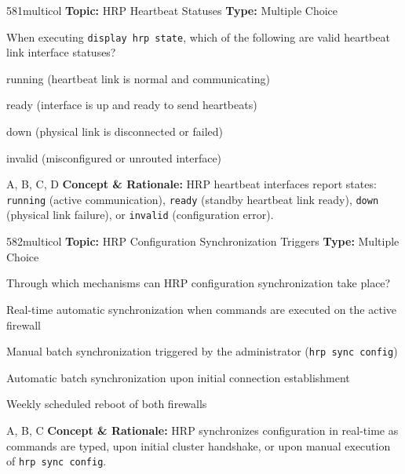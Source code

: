 \begin{qcard}{581}{multicol}
\textcolor{darkslate!75}{\small\textbf{Topic:} HRP Heartbeat Statuses \hfill \textbf{Type:} Multiple Choice}\vspace{0.4em}\par
When executing \texttt{display hrp state}, which of the following are valid heartbeat link interface statuses?
\begin{qoptions}
\item running (heartbeat link is normal and communicating)
\item ready (interface is up and ready to send heartbeats)
\item down (physical link is disconnected or failed)
\item invalid (misconfigured or unrouted interface)
\end{qoptions}
\end{qcard}
\nopagebreak
\begin{explainbox}{A, B, C, D}
\textbf{Concept \& Rationale:} HRP heartbeat interfaces report states: \texttt{running} (active communication), \texttt{ready} (standby heartbeat link ready), \texttt{down} (physical link failure), or \texttt{invalid} (configuration error).
\end{explainbox}

\begin{qcard}{582}{multicol}
\textcolor{darkslate!75}{\small\textbf{Topic:} HRP Configuration Synchronization Triggers \hfill \textbf{Type:} Multiple Choice}\vspace{0.4em}\par
Through which mechanisms can HRP configuration synchronization take place?
\begin{qoptions}
\item Real-time automatic synchronization when commands are executed on the active firewall
\item Manual batch synchronization triggered by the administrator (\texttt{hrp sync config})
\item Automatic batch synchronization upon initial connection establishment
\item Weekly scheduled reboot of both firewalls
\end{qoptions}
\end{qcard}
\nopagebreak
\begin{explainbox}{A, B, C}
\textbf{Concept \& Rationale:} HRP synchronizes configuration in real-time as commands are typed, upon initial cluster handshake, or upon manual execution of \texttt{hrp sync config}.
\end{explainbox}

